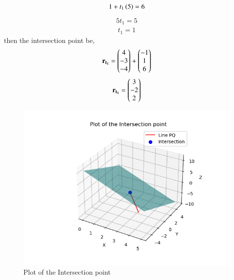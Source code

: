 \documentclass[journal]{IEEEtran}
\begin{document}
         \begin{align}
             1+t_1\left(5\right)=6
         \end{align}
         \begin{align}
             5t_1=5
         \end{align}
         \begin{align}
             t_1=1
         \end{align}
         then the intersection point be,
         \begin{align}
             \mathbf{r_{t_1}}=\begin{pmatrix}4\\-3\\-4\end{pmatrix}+\begin{pmatrix}-1\\1\\6\end{pmatrix}
         \end{align}
         \begin{align}
             \mathbf{r_{t_1}}=\begin{pmatrix}3\\-2\\2\end{pmatrix}
         \end{align}
         \begin{figure}[h]
             \centering
             \includegraphics[width=0.7\columnwidth]{figs/fig1.png}
             \caption{Plot of the Intersection point}
             \label{fig1}
         \end{figure}
         
\end{document}
